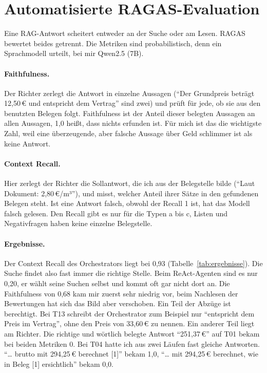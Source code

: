 \section{Automatisierte RAGAS-Evaluation}
\label{sec:ragas}

Eine RAG-Antwort scheitert entweder an der Suche oder am Lesen. RAGAS bewertet beides getrennt. Die Metriken sind probabilistisch, denn ein Sprachmodell urteilt, bei mir Qwen2.5 (7B).

\paragraph{Faithfulness.} Der Richter zerlegt die Antwort in einzelne Aussagen (\enquote{Der Grundpreis beträgt 12,50\,€ und entspricht dem Vertrag} sind zwei) und prüft für jede, ob sie aus den benutzten Belegen folgt. Faithfulness ist der Anteil dieser belegten Aussagen an allen Aussagen, 1,0 heißt, dass nichts erfunden ist. Für mich ist das die wichtigste Zahl, weil eine überzeugende, aber falsche Aussage über Geld schlimmer ist als keine Antwort.

\paragraph{Context Recall.} Hier zerlegt der Richter die Sollantwort, die ich aus der Belegstelle bilde (\enquote{Laut Dokument: 2,80\,€/m³}), und misst, welcher Anteil ihrer Sätze in den gefundenen Belegen steht. Ist eine Antwort falsch, obwohl der Recall 1 ist, hat das Modell falsch gelesen. Den Recall gibt es nur für die Typen a bis c, Listen und Negativfragen haben keine einzelne Belegstelle.

\paragraph{Ergebnisse.} Der Context Recall des Orchestrators liegt bei 0,93 (Tabelle~\ref{tab:ergebnisse}). Die Suche findet also fast immer die richtige Stelle. Beim ReAct-Agenten sind es nur 0,20, er wählt seine Suchen selbst und kommt oft gar nicht dort an. Die Faithfulness von 0,68 kam mir zuerst sehr niedrig vor, beim Nachlesen der Bewertungen hat sich das Bild aber verschoben. Ein Teil der Abzüge ist berechtigt. Bei T13 schreibt der Orchestrator zum Beispiel nur \enquote{entspricht dem Preis im Vertrag}, ohne den Preis von 33,60\,€ zu nennen. Ein anderer Teil liegt am Richter. Die richtige und wörtlich belegte Antwort \enquote{251,37\,€} auf T01 bekam bei beiden Metriken 0. Bei T04 hatte ich aus zwei Läufen fast gleiche Antworten. \enquote{\dots{} brutto mit 294,25\,€ berechnet [1]} bekam 1,0, \enquote{\dots{} mit 294,25\,€ berechnet, wie in Beleg [1] ersichtlich} bekam 0,0.


